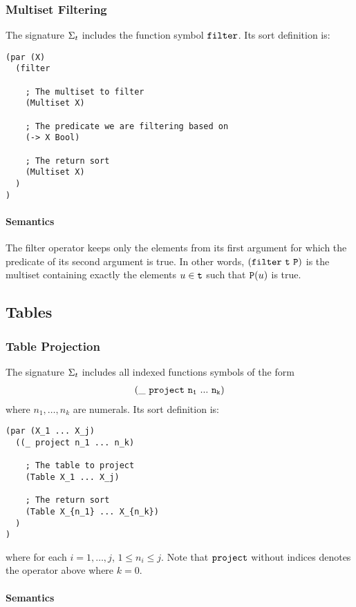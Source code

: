 \documentclass[english,a4paper,10pt]{article}
\begin{document}
\subsubsection{Multiset Filtering}
The signature $\Sigma_{t}$ includes 
the function symbol ${\tt filter}$. Its sort definition is:

\begin{verbatim}
(par (X)
  (filter
  
    ; The multiset to filter
    (Multiset X)
    
    ; The predicate we are filtering based on
    (-> X Bool)
    
    ; The return sort
    (Multiset X)
  )
)
\end{verbatim}

\paragraph{Semantics}
The filter operator keeps only the elements
from its first argument
for which the predicate of its second argument is true.
In other words,
${\tt (filter\ t\ P)}$
is the multiset containing exactly
the elements $u \in {\tt t}$
such that ${\tt P}(u)$ is true.

\subsection{Tables}

\subsubsection{Table Projection}
The signature $\Sigma_{t}$ includes 
all indexed functions symbols of the form
\begin{align*}
{\tt  
(\_\ project\ n_1\ ...\ n_k)
}
\end{align*}
where $n_1, \ldots, n_k$ are numerals.
Its sort definition is:
\begin{verbatim}
(par (X_1 ... X_j) 
  ((_ project n_1 ... n_k)
  
    ; The table to project
    (Table X_1 ... X_j)
    
    ; The return sort
    (Table X_{n_1} ... X_{n_k})
  )
)
\end{verbatim}
where for each $i = 1, \ldots, j$,
$1 \leq n_i \leq j$. 
Note that
${\tt project}$ without indices
denotes the operator above where $k=0$.

\paragraph{Semantics}
\end{document}
